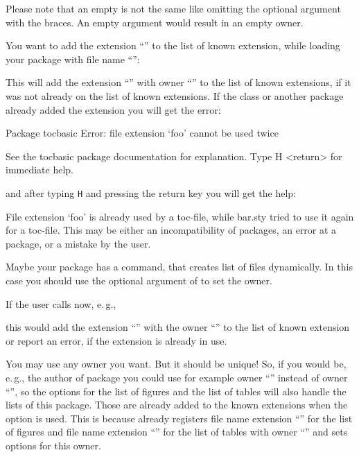 Please note that an empty  is not the same
like omitting the optional argument with the braces. An empty argument would
result in an empty owner.
\begin{Example}
  You want to add the extension ``'' to the list of known extension,
  while loading your package with file name ``'':
\begin{lstcode}
\end{lstcode}%
  This will add the extension ``'' with owner ``''
  to the list of known extensions, if it was not already on the list of known
  extensions. If the class or another package already added the extension you
  will get the error:
\begin{lstoutput}
  Package tocbasic Error: file extension `foo' cannot be used twice

  See the tocbasic package documentation for explanation.
  Type  H <return>  for immediate help.
\end{lstoutput}
  and after typing \texttt{H} and pressing the return key you will get the
  help:
\begin{lstoutput}
  File extension `foo' is already used by a toc-file, while bar.sty
  tried to use it again for a toc-file.
  This may be either an incompatibility of packages, an error at a package,
  or a mistake by the user.
\end{lstoutput}

  Maybe your package has a command, that creates list of files dynamically. In 
  this case you should use the optional argument of  to
  set the owner.
\begin{lstcode}
  \newcommand*{\createnewlistofsomething}[1]{%
    \addtotoclist[bar.sty]{#1}%
  }
\end{lstcode}
  If the user calls now, e.\,g.,
\begin{lstcode}
\end{lstcode}
  this would add the extension ``'' with the owner
  ``'' to the list of known extension or report an error, if
  the extension is already in use.
\end{Example}
You may use any owner you want.  But it should be unique!  So, if you would
be, e.\,g., the author of package  you could use for example
owner ``'' instead of owner ``'', so the
\KOMAScript{} options for the list of figures and the list of tables will also
handle the lists of this package. Those are already added to the known
extensions when the option is used. This is because \KOMAScript{} already
registers file name extension ``'' for the list of figures and
file name extension ``'' for the list of tables with owner
``'' and sets options for this owner.
%

